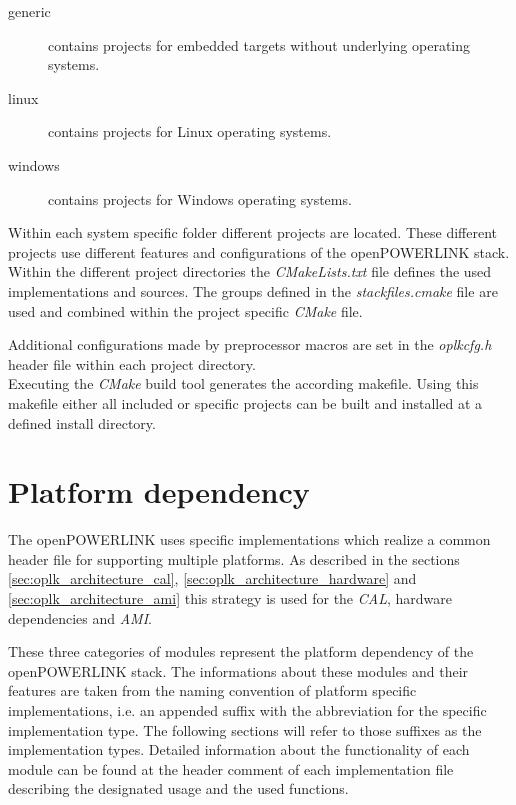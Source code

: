 \begin{description}
    \item[generic] contains projects for embedded targets without underlying operating systems.
    \item[linux] contains projects for Linux operating systems.
    \item[windows] contains projects for Windows operating systems.
\end{description}
\begin{sloppypar}
Within each system specific folder different projects are located.
These different projects use different features and configurations of the openPOWERLINK stack.
Within the different project directories the \emph{CMakeLists.txt} file defines the used implementations and sources.
The groups defined in the \emph{stackfiles.cmake} file are used and combined within the project specific \emph{CMake} file.
\end{sloppypar}

Additional configurations made by preprocessor macros are set in the \emph{oplkcfg.h} header file within each project directory.
\\

Executing the \emph{CMake} build tool generates the according makefile.
Using this makefile either all included or specific projects can be built and installed at a defined install directory. \cite[Building Stack Libraries]{openpowerlink_doc}

\section{Platform dependency}
\label{sec:oplk_platform}

The openPOWERLINK uses specific implementations which realize a common header file for supporting multiple platforms.
As described in the sections \ref{sec:oplk_architecture_cal}, \ref{sec:oplk_architecture_hardware} and \ref{sec:oplk_architecture_ami} this strategy is used for the \emph{CAL}, hardware dependencies and \emph{AMI}.

These three categories of modules represent the platform dependency of the openPOWERLINK stack.
The informations about these modules and their features are taken from the naming convention of platform specific implementations, i.e. an appended suffix with the abbreviation for the specific implementation type.
The following sections will refer to those suffixes as the implementation types.
Detailed information about the functionality of each module can be found at the header comment of each implementation file describing the designated usage and the used functions.

